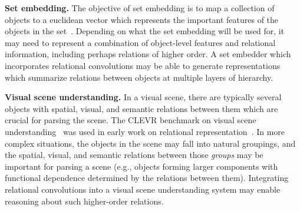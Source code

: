 \textbf{Set embedding.} The objective of set embedding is to map a collection of objects to a euclidean vector which represents the important features of the objects in the set~\citep{zaheer2017deep}. Depending on what the set embedding will be used for, it may need to represent a combination of object-level features and relational information, including perhaps relations of higher order. A set embedder which incorporates relational convolutions may be able to generate representations which summarize relations between objects at multiple layers of hierarchy.

\textbf{Visual scene understanding.} In a visual scene, there are typically several objects with spatial, visual, and semantic relations between them which are crucial for parsing the scene. The CLEVR benchmark on visual scene understanding~\citep{johnson2017clevr} was used in early work on relational representation~\citep{santoroSimpleNeural2017}. In more complex situations, the objects in the scene may fall into natural groupings, and the spatial, visual, and semantic relations between those \textit{groups} may be important for parsing a scene (e.g., objects forming larger components with functional dependence determined by the relations between them). Integrating relational convolutions into a visual scene understanding system may enable reasoning about such higher-order relations.